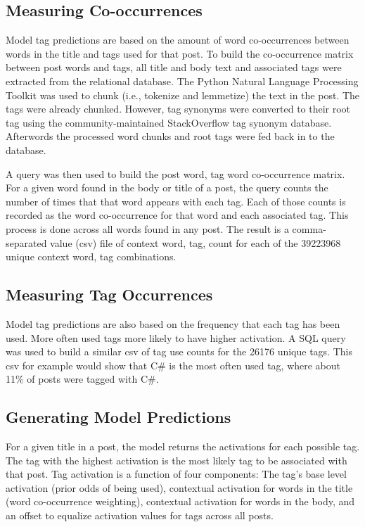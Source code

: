 \documentclass[10pt,letterpaper]{article}
\begin{document}
\subsection{Measuring Co-occurrences}

Model tag predictions are based on the amount of word co-occurrences between words in the title and tags used for that post.
To build the co-occurrence matrix between post words and tags, all title and body text and associated tags were extracted from the relational database.
The Python Natural Language Processing Toolkit \cite{Bird2009} was used to chunk (i.e., tokenize and lemmetize) the text in the post.
The tags were already chunked.
However, tag synonyms were converted to their root tag using the community-maintained StackOverflow tag synonym database.
Afterwords the processed word chunks and root tags were fed back in to the database.

A query was then used to build the post word, tag word co-occurrence matrix.
For a given word found in the body or title of a post, the query counts the number of times that that word appears with each tag.
Each of those counts is recorded as the word co-occurrence for that word and each associated tag.
This process is done across all words found in any post.
The result is a comma-separated value (csv) file of context word, tag, count for each of the \num{39223968} unique context word, tag combinations.

\subsection{Measuring Tag Occurrences}

Model tag predictions are also based on the frequency that each tag has been used.
More often used tags more likely to have higher activation.
A SQL query was used to build a similar csv of tag use counts for the \num{26176} unique tags.
This csv for example would show that C\# is the most often used tag, where about 11\% of posts were tagged with C\#.

\subsection{Generating Model Predictions}

For a given title in a post, the model returns the activations for each possible tag.
The tag with the highest activation is the most likely tag to be associated with that post.
Tag activation is a function of four components:
The tag's base level activation (prior odds of being used),
contextual activation for words in the title (word co-occurrence weighting),
contextual activation for words in the body,
and an offset to equalize activation values for tags across all posts.
\end{document}
